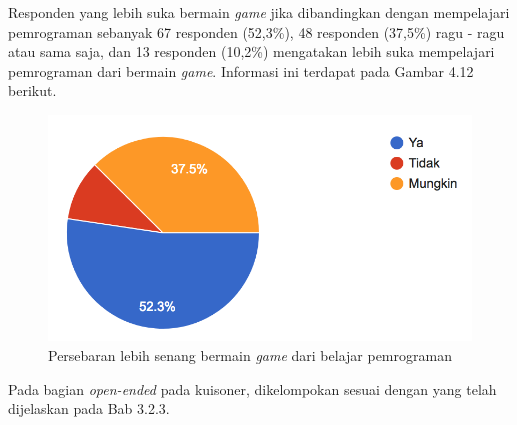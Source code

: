 	Responden yang lebih suka bermain \textit{game} jika dibandingkan dengan mempelajari pemrograman sebanyak 67 responden (52,3\%), 48 responden (37,5\%) ragu - ragu atau sama saja, dan 13 responden (10,2\%) mengatakan lebih suka mempelajari pemrograman dari bermain \textit{game}. Informasi ini terdapat pada Gambar 4.12 berikut.
	\begin{figure}
		\includegraphics[width=\linewidth]{pics/lebih-senang-bermain-game}
		\caption{Persebaran lebih senang bermain \textit{game} dari belajar pemrograman}
		\centering
	\end{figure}
%
Pada bagian \textit{open-ended} pada kuisoner, dikelompokan sesuai dengan yang telah dijelaskan pada Bab 3.2.3.
